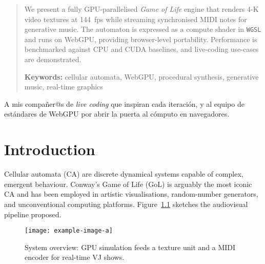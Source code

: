 \documentclass{report}
\begin{document}
\renewcommand{\abstractname}{Abstract}
\begin{abstract}
We present a fully GPU-parallelised \emph{Game of Life} engine that renders
4-K video textures at \SI{144}{fps} while streaming synchronised MIDI notes for
generative music.  The automaton is expressed as a compute shader in
\texttt{WGSL} and runs on WebGPU, providing browser-level portability.
Performance is benchmarked against CPU and CUDA baselines, and live-coding
use-cases are demonstrated.

\medskip
\noindent\textbf{Keywords:} cellular automata, WebGPU, procedural synthesis,
generative music, real-time graphics
\end{abstract}

\begin{umaacknowledgments}
A mis compañer@s de \emph{live coding} que inspiran cada iteración, y al equipo
de estándares de WebGPU por abrir la puerta al cómputo en navegadores.
\end{umaacknowledgments}

\cleardoublepage
\tableofcontents
\cleardoublepage
\listoffigures
\cleardoublepage
\listoftables
\cleardoublepage

\printnomenclature
\cleardoublepage

\mainmatter
\chapter{Introduction}
Cellular automata (CA) are discrete dynamical systems capable of complex,
emergent behaviour.  Conway’s Game of Life (GoL) is arguably the most iconic
CA and has been employed in artistic visualisations, random-number
generators, and unconventional computing platforms.  
Figure~\cref{fig:overview} sketches the audiovisual pipeline proposed.

\begin{figure}[ht]
  \centering
  \texttt{[image: example-image-a]}
  \caption{System overview: GPU simulation feeds a texture unit and a MIDI
           encoder for real-time VJ shows.}
  \label{fig:overview}
\end{figure}
\end{document}
